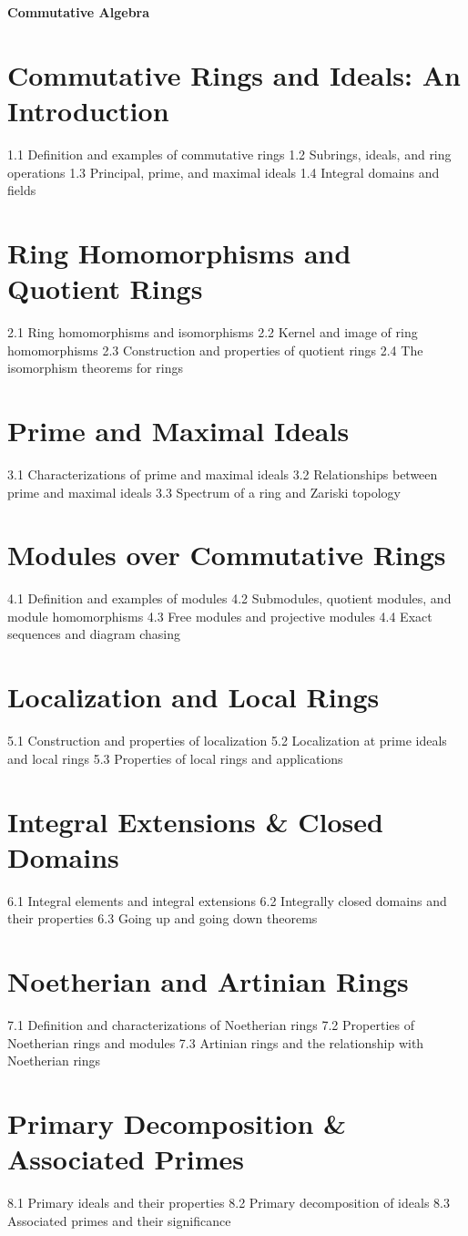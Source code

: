 {\LARGE \bf{Commutative Algebra}}
\section{Commutative Rings and Ideals: An Introduction}
1.1 Definition and examples of commutative rings
1.2 Subrings, ideals, and ring operations
1.3 Principal, prime, and maximal ideals
1.4 Integral domains and fields
\section{Ring Homomorphisms and Quotient Rings}
2.1 Ring homomorphisms and isomorphisms
2.2 Kernel and image of ring homomorphisms
2.3 Construction and properties of quotient rings
2.4 The isomorphism theorems for rings
\section{Prime and Maximal Ideals}
3.1 Characterizations of prime and maximal ideals
3.2 Relationships between prime and maximal ideals
3.3 Spectrum of a ring and Zariski topology
\section{Modules over Commutative Rings}
4.1 Definition and examples of modules
4.2 Submodules, quotient modules, and module homomorphisms
4.3 Free modules and projective modules
4.4 Exact sequences and diagram chasing
\section{Localization and Local Rings}
5.1 Construction and properties of localization
5.2 Localization at prime ideals and local rings
5.3 Properties of local rings and applications
\section{Integral Extensions \& Closed Domains}
6.1 Integral elements and integral extensions
6.2 Integrally closed domains and their properties
6.3 Going up and going down theorems
\section{Noetherian and Artinian Rings}
7.1 Definition and characterizations of Noetherian rings
7.2 Properties of Noetherian rings and modules
7.3 Artinian rings and the relationship with Noetherian rings
\section{Primary Decomposition \& Associated Primes}
8.1 Primary ideals and their properties
8.2 Primary decomposition of ideals
8.3 Associated primes and their significance

